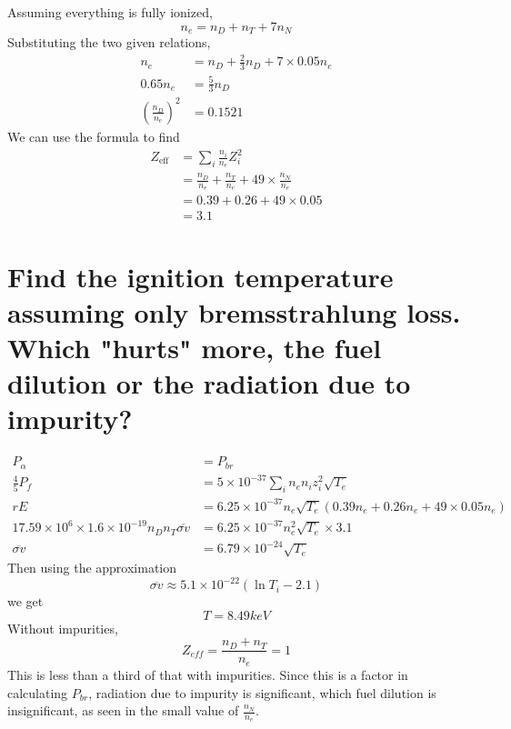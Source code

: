 \documentclass[answers]{exam}
\begin{document}
\begin{questions}
\begin{parts}
\begin{solution}
    Assuming everything is fully ionized,
    $$n_e = n_D + n_T + 7n_N$$
    Substituting the two given relations,
    \begin{align*}
        n_e &= n_D + \frac{2}{3} n_D + 7 \times 0.05 n_e \\
        0.65n_e &= \frac{5}{3} n_D \\
        \left(\frac{n_D}{n_e}\right)^2 &= 0.1521
    \end{align*}
    We can use the formula to find
    \begin{align*}
        Z_{\text{eff}} &= \sum_i \frac{n_i}{n_e} Z_i^2 \\
                       &= \frac{n_D}{n_e} + \frac{n_T}{n_e} + 49 \times \frac{n_N}{n_e} \\
                       &= 0.39 + 0.26 + 49 \times 0.05 \\
                       &= 3.1
    \end{align*}
\end{solution}

\part{Find the ignition temperature assuming only bremsstrahlung loss. Which "hurts" more, the fuel dilution or the radiation due to impurity?}

\begin{solution}
    \begin{align*}
        P_\alpha &= P_{br} \\
        \frac{4}{5} P_f &= 5 \times 10^{-37} \sum_i n_en_i z_i^2 \sqrt{T_e} \\
        rE &= 6.25 \times 10^{-37}n_e \sqrt{T_e} (0.39n_e + 0.26n_e + 49 \times 0.05n_e) \\
        17.59 \times 10^6 \times 1.6 \times 10^{-19} n_Dn_T \overline{\sigma v} &= 6.25 \times 10^{-37}n_e^2 \sqrt{T_e} \times 3.1 \\
        \overline{\sigma v} &= 6.79 \times 10^{-24} \sqrt{T_e}
    \end{align*}
    Then using the approximation
    $$\overline{\sigma v} \approx 5.1 \times 10^{-22} (\ln T_i - 2.1)$$
    we get
    $$T = 8.49\unit{keV}$$
    Without impurities,
    $$Z_{eff} = \frac{n_D + n_T}{n_e} = 1$$
    This is less than a third of that with impurities. Since this is a factor in calculating $P_{br}$, radiation due to impurity is significant, which fuel dilution is insignificant, as seen in the small value of $\frac{n_N}{n_e}$.
\end{solution}


\end{parts}
\end{questions}
\end{document}
